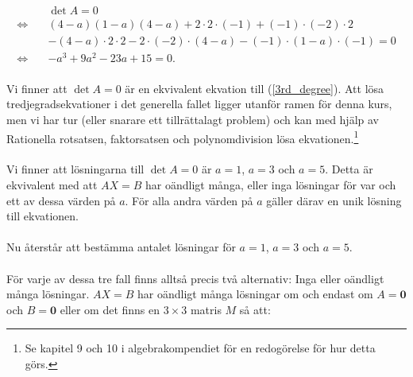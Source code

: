 \documentclass{article}
\begin{document}
\begin{align}
  &\det A = 0\nonumber\\
  \iff \quad &(4 - a)(1 - a)(4 - a) + 2\cdot2\cdot(-1) + (-1)\cdot(-2)\cdot2\nonumber\\
  &- (4 - a)\cdot2\cdot2 - 2\cdot(-2)\cdot(4 - a) - (-1)\cdot(1 - a)\cdot(-1) = 0\nonumber\\
  \iff \quad &-a^{3} + 9a^{2} -23a +15 = 0\text{.} \label{3rd_degree}
\end{align}
\\
Vi finner att $\det A = 0$ är en ekvivalent ekvation till (\ref{3rd_degree}). Att lösa tredjegradsekvationer i det generella fallet ligger utanför ramen för denna kurs, men vi har tur (eller snarare ett tillrättalagt problem) och kan med hjälp av Rationella rotsatsen, faktorsatsen och polynomdivision lösa ekvationen.\footnote{Se kapitel 9 och 10 i algebrakompendiet för en redogörelse för hur detta görs.}
\\
\\
Vi finner att lösningarna till $\det A = 0$ är $a = 1$, $a = 3$ och $a = 5$. Detta är ekvivalent med att $AX = B$ har oändligt många, eller inga lösningar för var och ett av dessa värden på $a$. För alla andra värden på $a$ gäller därav en unik lösning till ekvationen.
\\
\\
Nu återstår att bestämma antalet lösningar för $a = 1$, $a = 3$ och $a = 5$.
\\
\\
För varje av dessa tre fall finns alltså precis två alternativ: Inga eller oändligt många lösningar. $AX = B$ har oändligt många lösningar om och endast om $A = \mathbf{0}$ och $B = \mathbf{0}$ eller om det finns en $3 \times 3$ matris $M$ så att:
\end{document}
